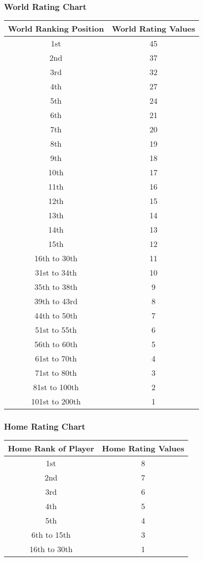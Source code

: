\documentclass{article}
\begin{document}
\subsubsection{World Rating Chart}
\begin{center}
\begin{tabular}{ | c | c | }
\hline
World Ranking Position &	World Rating Values\\
\hline
1st &	45\\
2nd &	37\\
3rd	&32\\
4th	&27\\
5th	&24\\
6th	&21\\
7th	&20\\
8th	&19\\
9th	&18\\
10th&	17\\
11th&	16\\
12th&	15\\
13th&	14\\
14th&	13\\
15th&	12\\
16th to 30th&	11\\
31st to 34th&	10\\
35th to 38th	&9\\
39th to 43rd	&8\\
44th to 50th	&7\\
51st to 55th	&6\\
56th to 60th	&5\\
61st to 70th	&4\\
71st to 80th	&3\\
81st to 100th	&2\\
101st to 200th& 	1\\
\hline
\end{tabular}
\end{center}

\subsubsection{Home Rating Chart}

\begin{center}
\begin{tabular}{ | c | c | }
\hline
Home Rank of Player	&Home Rating Values\\
\hline
1st	&8\\
2nd	&7\\
3rd	&6\\
4th	&5\\
5th	&4\\
6th to 15th	&3\\
16th to 30th	&1\\
\hline
\end{tabular}
\end{center}
\end{document}
